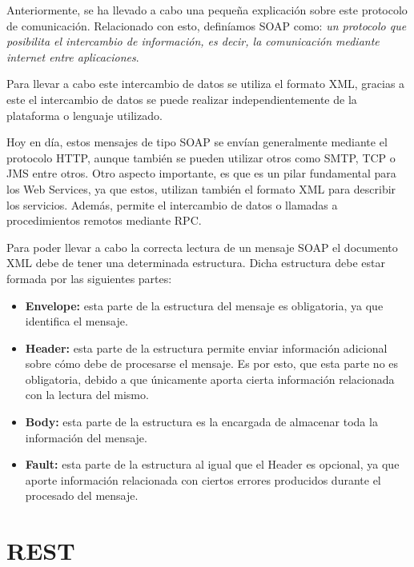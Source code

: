 Anteriormente, se ha llevado a cabo una pequeña explicación sobre este protocolo de comunicación. Relacionado con esto, definíamos SOAP como: \emph{un protocolo que posibilita el intercambio de información, es decir, la comunicación mediante internet entre aplicaciones}.

Para llevar a cabo este intercambio de datos se utiliza el formato XML, gracias a este el intercambio de datos se puede realizar independientemente de la plataforma o lenguaje utilizado.

Hoy en día, estos mensajes de tipo SOAP se envían generalmente mediante el protocolo HTTP, aunque también se pueden utilizar otros como SMTP, TCP o JMS entre otros. Otro aspecto importante,  es que es un pilar fundamental para los Web Services, ya que estos, utilizan también el formato XML para describir los servicios. Además, permite el intercambio de datos o llamadas a procedimientos remotos mediante RPC.

Para poder llevar a cabo la correcta lectura de un mensaje SOAP el documento XML debe de tener una determinada estructura. Dicha estructura debe estar formada por las siguientes partes:

\begin{itemize}

	\item \textbf{Envelope:} esta parte de la estructura del mensaje es obligatoria, ya que identifica el mensaje.
	
	\item \textbf{Header:} esta parte de la estructura permite enviar información adicional sobre cómo debe de procesarse el mensaje. Es por esto, que esta parte no es obligatoria, debido a que únicamente aporta cierta información relacionada con la lectura del mismo.
	
	\item \textbf{Body:} esta parte de la estructura es la encargada de almacenar toda la información del mensaje.
	
	\item \textbf{Fault:} esta parte de la estructura al igual que el Header es opcional, ya que aporte información relacionada con ciertos errores producidos durante el procesado del mensaje.
	
\end{itemize}



\section{REST}\label{sec:Rest}


